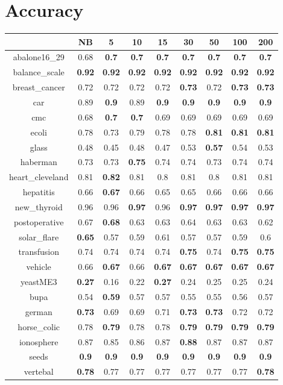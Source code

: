 \documentclass{article}%
\begin{document}
%
\normalsize%
\section*{Accuracy}%
\begin{tabular}{c|cccccccc}%
\hline%
&NB&5&10&15&30&50&100&200\\%
\hline%
abalone16\_29&0.68&\textbf{0.7}&\textbf{0.7}&\textbf{0.7}&\textbf{0.7}&\textbf{0.7}&\textbf{0.7}&\textbf{0.7}\\%
\hline%
balance\_scale&\textbf{0.92}&\textbf{0.92}&\textbf{0.92}&\textbf{0.92}&\textbf{0.92}&\textbf{0.92}&\textbf{0.92}&\textbf{0.92}\\%
\hline%
breast\_cancer&0.72&0.72&0.72&0.72&\textbf{0.73}&0.72&\textbf{0.73}&\textbf{0.73}\\%
\hline%
car&0.89&\textbf{0.9}&0.89&\textbf{0.9}&\textbf{0.9}&\textbf{0.9}&\textbf{0.9}&\textbf{0.9}\\%
\hline%
cmc&0.68&\textbf{0.7}&\textbf{0.7}&0.69&0.69&0.69&0.69&0.69\\%
\hline%
ecoli&0.78&0.73&0.79&0.78&0.78&\textbf{0.81}&\textbf{0.81}&\textbf{0.81}\\%
\hline%
glass&0.48&0.45&0.48&0.47&0.53&\textbf{0.57}&0.54&0.53\\%
\hline%
haberman&0.73&0.73&\textbf{0.75}&0.74&0.74&0.73&0.74&0.74\\%
\hline%
heart\_cleveland&0.81&\textbf{0.82}&0.81&0.8&0.81&0.8&0.81&0.81\\%
\hline%
hepatitis&0.66&\textbf{0.67}&0.66&0.65&0.65&0.66&0.66&0.66\\%
\hline%
new\_thyroid&0.96&0.96&\textbf{0.97}&0.96&\textbf{0.97}&\textbf{0.97}&\textbf{0.97}&\textbf{0.97}\\%
\hline%
postoperative&0.67&\textbf{0.68}&0.63&0.63&0.64&0.63&0.63&0.62\\%
\hline%
solar\_flare&\textbf{0.65}&0.57&0.59&0.61&0.57&0.57&0.59&0.6\\%
\hline%
transfusion&0.74&0.74&0.74&0.74&\textbf{0.75}&0.74&\textbf{0.75}&\textbf{0.75}\\%
\hline%
vehicle&0.66&\textbf{0.67}&0.66&\textbf{0.67}&\textbf{0.67}&\textbf{0.67}&\textbf{0.67}&\textbf{0.67}\\%
\hline%
yeastME3&\textbf{0.27}&0.16&0.22&\textbf{0.27}&0.24&0.25&0.25&0.24\\%
\hline%
bupa&0.54&\textbf{0.59}&0.57&0.57&0.55&0.55&0.56&0.57\\%
\hline%
german&\textbf{0.73}&0.69&0.69&0.71&\textbf{0.73}&\textbf{0.73}&0.72&0.72\\%
\hline%
horse\_colic&0.78&\textbf{0.79}&0.78&0.78&\textbf{0.79}&\textbf{0.79}&\textbf{0.79}&\textbf{0.79}\\%
\hline%
ionosphere&0.87&0.85&0.86&0.87&\textbf{0.88}&0.87&0.87&0.87\\%
\hline%
seeds&\textbf{0.9}&\textbf{0.9}&\textbf{0.9}&\textbf{0.9}&\textbf{0.9}&\textbf{0.9}&\textbf{0.9}&\textbf{0.9}\\%
\hline%
vertebal&\textbf{0.78}&0.77&0.77&0.77&0.77&0.77&0.77&\textbf{0.78}\\%
\hline%
\end{tabular}
\end{document}
